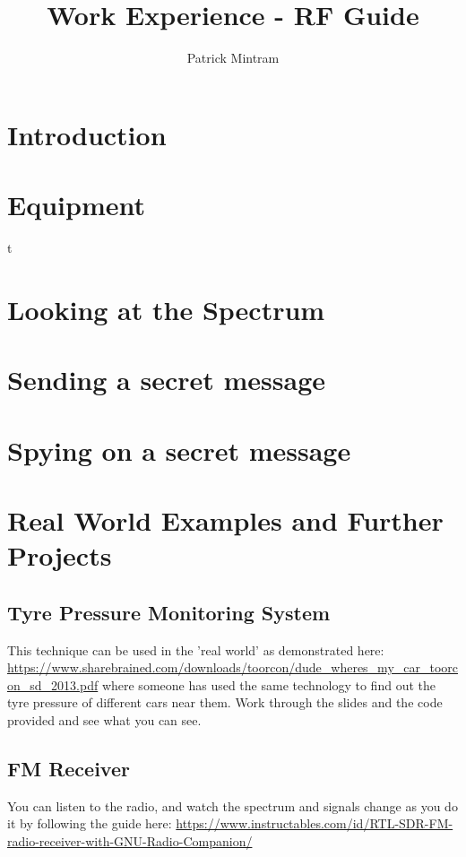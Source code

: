 \documentclass[titlepage,a4paper]{article}
\begin{document}
\title{Work Experience - RF Guide}
\author{Patrick Mintram}
\maketitle

\tableofcontents
\listoffigures
\newpage

\section{Introduction}

\newpage

\section{Equipment}
t
\newpage

\section{Looking at the Spectrum}

\newpage

\section{Sending a secret message}

\newpage

\section{Spying on a secret message}

\newpage

\section{Real World Examples and Further Projects}
\subsection{Tyre Pressure Monitoring System}
This technique can be used in the 'real world' as demonstrated here: \url{https://www.sharebrained.com/downloads/toorcon/dude\_wheres\_my\_car\_toorcon\_sd\_2013.pdf} where someone has used the same technology to find out the tyre pressure of different cars near them. Work through the slides and the code provided and see what you can see.

\subsection{FM Receiver}
You can listen to the radio, and watch the spectrum and signals change as you do it by following the guide here: \url{https://www.instructables.com/id/RTL-SDR-FM-radio-receiver-with-GNU-Radio-Companion/}
\end{document}
